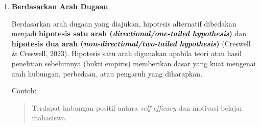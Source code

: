 \documentclass[
  indonesian,
  letterpaper,
  DIV=11,
  numbers=noendperiod]{scrreprt}
\begin{document}
\begin{enumerate}
  atau

  \begin{quote}
  H₀: Tidak terdapat perbedaan tingkat stres antara kelompok yang
  mengikuti pelatihan \emph{mindfulness} dan kelompok kontrol.
  \end{quote}

  Dalam praktik penelitian, pengujian statistik pada dasarnya dilakukan
  untuk mengevaluasi apakah terdapat bukti yang cukup untuk
  \textbf{menolak H₀}. Oleh karena itu, peneliti tidak berusaha
  ``membuktikan'' H₀ benar, melainkan mencari bukti apakah H₀ dapat
  ditolak berdasarkan data yang diperoleh.

  Hipotesis alternatif merupakan kebalikan dari hipotesis nol. Hipotesis
  ini menyatakan bahwa \textbf{terdapat hubungan, perbedaan, atau
  pengaruh} antarvariabel dalam populasi. Dalam laporan penelitian,
  hipotesis penelitian yang ditulis pada Bab Pendahuluan umumnya
  merupakan bentuk verbal dari hipotesis alternatif, sedangkan H₀ dan H₁
  digunakan secara eksplisit pada tahap analisis statistik.

  Contoh:

  \begin{quote}
  H₁: Terdapat hubungan antara \emph{self-efficacy} dan motivasi belajar
  mahasiswa.
  \end{quote}

  atau

  \begin{quote}
  H₁: Terdapat perbedaan tingkat stres antara kelompok yang mengikuti
  pelatihan \emph{mindfulness} dan kelompok kontrol.
  \end{quote}
\item
  \textbf{Berdasarkan Arah Dugaan}

  Berdasarkan arah dugaan yang diajukan, hipotesis alternatif dibedakan
  menjadi \textbf{hipotesis satu arah (\emph{directional/one-tailed
  hypothesis})} dan \textbf{hipotesis dua arah
  (\emph{non-directional/two-tailed hypothesis})} (Creswell \& Creswell,
  2023). Hipotesis satu arah digunakan apabila teori atau hasil
  penelitian sebelumnya (bukti empiris) memberikan dasar yang kuat
  mengenai arah hubungan, perbedaan, atau pengaruh yang diharapkan.

  Contoh:

  \begin{quote}
  Terdapat hubungan positif antara \emph{self-efficacy} dan motivasi
  belajar mahasiswa.
  \end{quote}


\end{enumerate}
\end{document}
